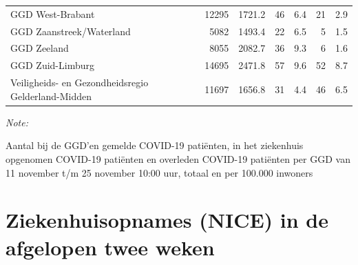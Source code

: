 \documentclass[
  english,
  man,floatsintext]{apa6}
\begin{document}
\begin{table}
\begin{threeparttable}
\begin{tabular}{lrrrrrr}
GGD West-Brabant & 12295 & 1721.2 & 46 & 6.4 & 21 & 2.9\\
GGD Zaanstreek/Waterland & 5082 & 1493.4 & 22 & 6.5 & 5 & 1.5\\
GGD Zeeland & 8055 & 2082.7 & 36 & 9.3 & 6 & 1.6\\
GGD Zuid-Limburg & 14695 & 2471.8 & 57 & 9.6 & 52 & 8.7\\
Veiligheids- en Gezondheidsregio Gelderland-Midden & 11697 & 1656.8 & 31 & 4.4 & 46 & 6.5\\
\bottomrule
\end{tabular}
\begin{tablenotes}
\item \textit{Note: } 
\item Aantal bij de GGD’en gemelde COVID-19 patiënten, in het ziekenhuis opgenomen COVID-19 patiënten en overleden COVID-19 patiënten per GGD van 11 november t/m 25 november 10:00 uur, totaal en per 100.000 inwoners
\end{tablenotes}
\end{threeparttable}
\endgroup{}
\end{table}

\newpage

\hypertarget{ziekenhuisopnames-nice-in-de-afgelopen-twee-weken}{%
\section{Ziekenhuisopnames (NICE) in de afgelopen twee weken}\label{ziekenhuisopnames-nice-in-de-afgelopen-twee-weken}}
\end{document}
